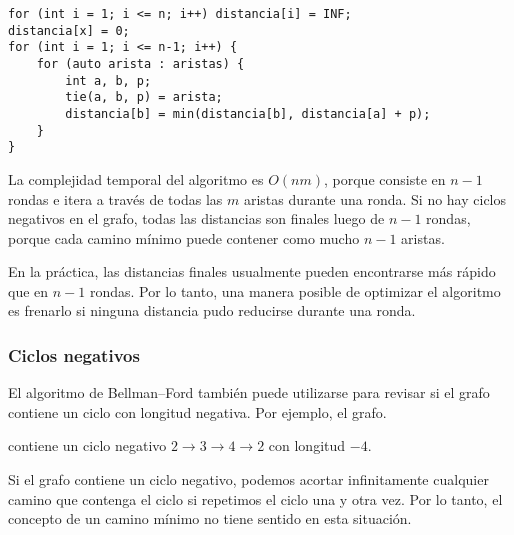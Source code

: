 \begin{lstlisting}
for (int i = 1; i <= n; i++) distancia[i] = INF;
distancia[x] = 0;
for (int i = 1; i <= n-1; i++) {
    for (auto arista : aristas) {
        int a, b, p;
        tie(a, b, p) = arista;
        distancia[b] = min(distancia[b], distancia[a] + p);
    }
}
\end{lstlisting}

La complejidad temporal del algoritmo es $O(nm)$,
porque consiste en $n-1$ rondas e itera a través de todas
las $m$ aristas durante una ronda. Si no hay ciclos negativos
en el grafo, todas las distancias son finales luego de $n-1$ rondas,
porque cada camino mínimo puede contener como mucho $n-1$ aristas.

En la práctica, las distancias finales usualmente pueden encontrarse
más rápido que en $n-1$ rondas. Por lo tanto, una manera posible de
optimizar el algoritmo es frenarlo si ninguna distancia pudo
reducirse durante una ronda.

\subsubsection{Ciclos negativos}


El algoritmo de Bellman--Ford también puede utilizarse para
revisar si el grafo contiene un ciclo con longitud negativa.
Por ejemplo, el grafo.

\begin{center}
\end{center}
\noindent

contiene un ciclo negativo
$2 \rightarrow 3 \rightarrow 4 \rightarrow 2$
con longitud $-4$.

Si el grafo contiene un ciclo negativo, podemos acortar
infinitamente cualquier camino que contenga el ciclo si
repetimos el ciclo una y otra vez. Por lo tanto, el concepto
de un camino mínimo no tiene sentido en esta situación.

